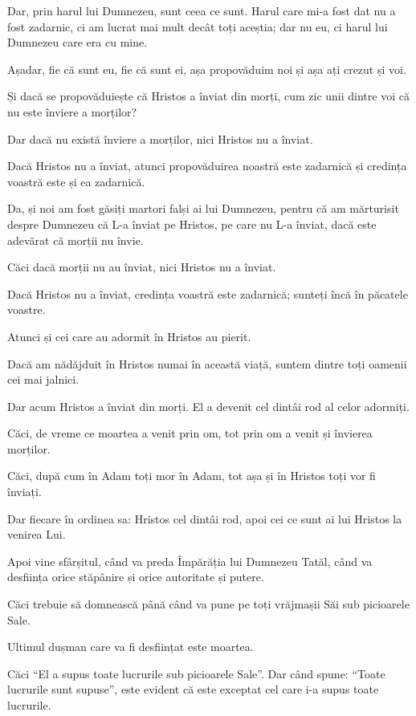 {Dar, prin harul lui Dumnezeu, sunt ceea ce sunt. Harul care mi-a fost dat nu a fost zadarnic, ci am lucrat mai mult decât toți aceștia; dar nu eu, ci harul lui Dumnezeu care era cu mine.

Așadar, fie că sunt eu, fie că sunt ei, așa propovăduim noi și așa ați crezut și voi.


\par }{\PP {}Și dacă se propovăduiește că Hristos a înviat din morți, cum zic unii dintre voi că nu este înviere a morților?

Dar dacă nu există înviere a morților, nici Hristos nu a înviat.

Dacă Hristos nu a înviat, atunci propovăduirea noastră este zadarnică și credința voastră este și ea zadarnică.

Da, și noi am fost găsiți martori falși ai lui Dumnezeu, pentru că am mărturisit despre Dumnezeu că L-a înviat pe Hristos, pe care nu L-a înviat, dacă este adevărat că morții nu învie.

Căci dacă morții nu au înviat, nici Hristos nu a înviat.

Dacă Hristos nu a înviat, credința voastră este zadarnică; sunteți încă în păcatele voastre.

Atunci și cei care au adormit în Hristos au pierit.

Dacă am nădăjduit în Hristos numai în această viață, suntem dintre toți oamenii cei mai jalnici.


\par }{\PP {}Dar acum Hristos a înviat din morți. El a devenit cel dintâi rod al celor adormiți.

Căci, de vreme ce moartea a venit prin om, tot prin om a venit și învierea morților.

Căci, după cum în Adam toți mor în Adam, tot așa și în Hristos toți vor fi înviați.

Dar fiecare în ordinea sa: Hristos cel dintâi rod, apoi cei ce sunt ai lui Hristos la venirea Lui.

Apoi vine sfârșitul, când va preda Împărăția lui Dumnezeu Tatăl, când va desființa orice stăpânire și orice autoritate și putere.

Căci trebuie să domnească până când va pune pe toți vrăjmașii Săi sub picioarele Sale.

Ultimul dușman care va fi desființat este moartea.

Căci “El a supus toate lucrurile sub picioarele Sale”. Dar când spune: “Toate lucrurile sunt supuse”, este evident că este exceptat cel care i-a supus toate lucrurile.

}
